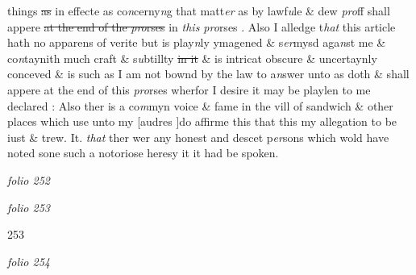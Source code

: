 \documentclass[12pt, a4paper]{book}
\begin{document}
			 things \sout{as} in effecte as co\textit{n}cerny\textit{n}g that matt\textit{er} as by lawf\textit{u}le \& dew \textit{pro}ff shall appere \sout{at the end of the \textit{pro}rses}
               in \textit{this pro}rses
			. Also I alledge t\textit{hat} this article hath no apparens of verite but is play\textit{n}ly ymagened \& s\textit{er}mysd aga\textit{n}st me \& co\textit{n}taynith much craft \& s\textit{u}btillty \sout{in it}
               \& is intricat obscure \& uncertaynly conceved
			 \& is such as I am not bownd by the law to a\textit{n}swer unto as doth \& shall appere at the end of this \textit{pro}rses wherfor I desire it may be playlen to me declared
			 : Also ther is a co\textit{m}myn voice \& fame in the vill
			 of sandwich \& other places which use unto my [audres ]do affirme this  that this my allegation to be iust \& trew. It. \textit{that} ther wer any honest and descet p\textit{er}sons which wold have noted sone such a notoriose heresy it it had be spoken.

\dotfill
					

\textit{folio 252}


         \vspace{4cm}
         
\dotfill
					

\textit{folio 253}


{\color{Mahogany}253}

\dotfill
					

\textit{folio 254}


         \vspace{4cm}
         
\dotfill
					  \section*{}  \subsection*{}
\end{document}
